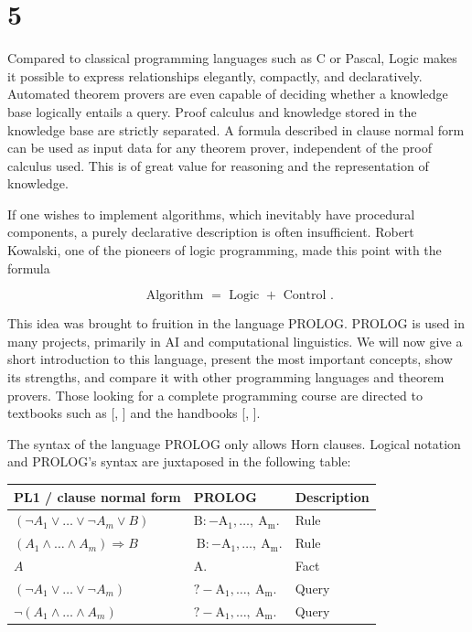 \documentclass[10pt]{article}
\begin{document}
\section*{5}
Compared to classical programming languages such as C or Pascal, Logic makes it possible to express relationships elegantly, compactly, and declaratively. Automated theorem provers are even capable of deciding whether a knowledge base logically entails a query. Proof calculus and knowledge stored in the knowledge base are strictly separated. A formula described in clause normal form can be used as input data for any theorem prover, independent of the proof calculus used. This is of great value for reasoning and the representation of knowledge.

If one wishes to implement algorithms, which inevitably have procedural components, a purely declarative description is often insufficient. Robert Kowalski, one of the pioneers of logic programming, made this point with the formula

$$
\text { Algorithm }=\text { Logic }+ \text { Control } .
$$

This idea was brought to fruition in the language PROLOG. PROLOG is used in many projects, primarily in AI and computational linguistics. We will now give a short introduction to this language, present the most important concepts, show its strengths, and compare it with other programming languages and theorem provers. Those looking for a complete programming course are directed to textbooks such as [\cite{bratko2011prolog}, \cite{clocksin1994programming}] and the handbooks [\cite{wielemaker2004swipl}, \cite{diaz2004gnu}].

The syntax of the language PROLOG only allows Horn clauses. Logical notation and PROLOG's syntax are juxtaposed in the following table:

\begin{center}
\begin{tabular}{lll}
\hline
PL1 / clause normal form & PROLOG & Description \\
\hline
$\left(\neg A_{1} \vee \ldots \vee \neg A_{m} \vee B\right)$ & $\mathrm{B}:-\mathrm{A}_{1}, \ldots, \mathrm{~A}_{\mathrm{m}}$. & Rule \\
\hline
$\left(A_{1} \wedge \ldots \wedge A_{m}\right) \Rightarrow B$ & $\mathrm{~B}:-\mathrm{A}_{1}, \ldots, \mathrm{~A}_{\mathrm{m}}$. & Rule \\
\hline
$A$ & A. & Fact \\
\hline
$\left(\neg A_{1} \vee \ldots \vee \neg A_{m}\right)$ & $?-\mathrm{A}_{1}, \ldots, \mathrm{~A}_{\mathrm{m}}$. & Query \\
\hline
$\neg\left(A_{1} \wedge \ldots \wedge A_{m}\right)$ & $?-\mathrm{A}_{1}, \ldots, \mathrm{~A}_{\mathrm{m}}$. & Query \\
\hline
\end{tabular}
\end{center}
\end{document}
